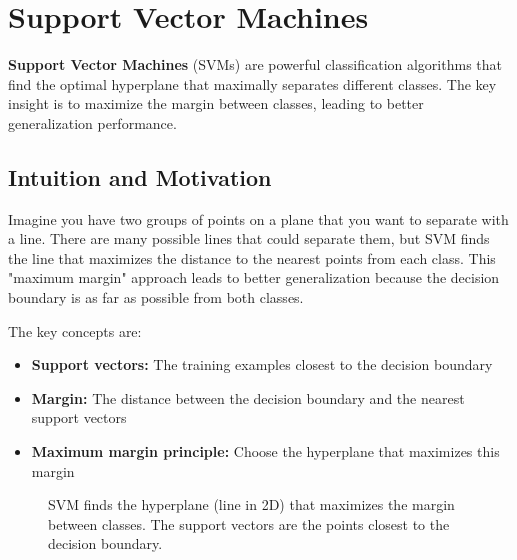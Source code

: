 
\section{Support Vector Machines}
\label{sec:svm}

\textbf{Support Vector Machines} (SVMs) are powerful classification algorithms that find the optimal hyperplane that maximally separates different classes. The key insight is to maximize the margin between classes, leading to better generalization performance.

\subsection{Intuition and Motivation}

Imagine you have two groups of points on a plane that you want to separate with a line. There are many possible lines that could separate them, but SVM finds the line that maximizes the distance to the nearest points from each class. This "maximum margin" approach leads to better generalization because the decision boundary is as far as possible from both classes.

The key concepts are:
\begin{itemize}
    \item \textbf{Support vectors:} The training examples closest to the decision boundary
    \item \textbf{Margin:} The distance between the decision boundary and the nearest support vectors
    \item \textbf{Maximum margin principle:} Choose the hyperplane that maximizes this margin
\end{itemize}

\begin{figure}[htbp]
\centering
{}
\caption{SVM finds the hyperplane (line in 2D) that maximizes the margin between classes. The support vectors are the points closest to the decision boundary.}
\label{fig:svm-margin}
\end{figure}

